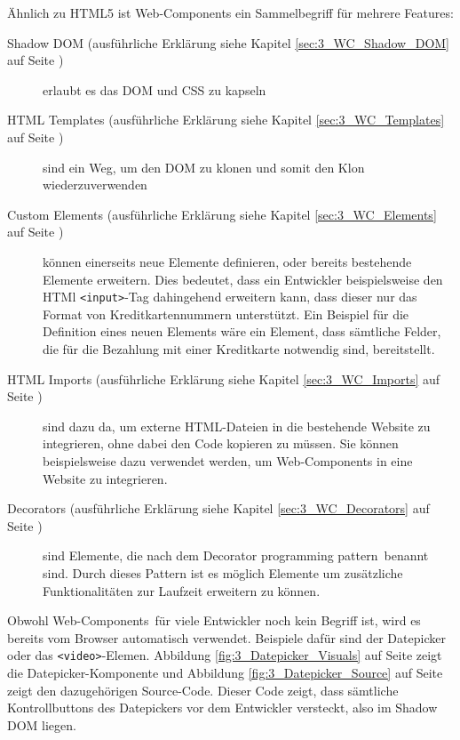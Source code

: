 Ähnlich zu HTML5 ist Web-Components ein Sammelbegriff für mehrere Features:
\begin{description}
\item[Shadow DOM (ausführliche Erklärung siehe Kapitel \ref{sec:3_WC_Shadow_DOM} auf Seite \pageref{sec:3_WC_Shadow_DOM})] erlaubt es das DOM und CSS zu kapseln
\item[HTML Templates (ausführliche Erklärung siehe Kapitel \ref{sec:3_WC_Templates} auf Seite \pageref{sec:3_WC_Templates})] sind ein Weg, um den DOM zu klonen und somit den Klon wiederzuverwenden
\item[Custom Elements (ausführliche Erklärung siehe Kapitel \ref{sec:3_WC_Elements} auf Seite \pageref{sec:3_WC_Elements})] können einerseits neue Elemente definieren, oder bereits bestehende Elemente erweitern. Dies bedeutet, dass ein Entwickler beispielsweise den HTMl \lstinline|<input>|-Tag dahingehend erweitern kann, dass dieser nur das Format von Kreditkartennummern unterstützt. Ein Beispiel für die Definition eines neuen Elements wäre ein Element, dass sämtliche Felder, die für die Bezahlung mit einer Kreditkarte notwendig sind, bereitstellt.
\item[HTML Imports (ausführliche Erklärung siehe Kapitel \ref{sec:3_WC_Imports} auf Seite \pageref{sec:3_WC_Imports})] sind dazu da, um externe HTML-Dateien in die bestehende Website zu integrieren, ohne dabei den Code kopieren zu müssen. Sie können beispielsweise dazu verwendet werden, um Web-Components in eine Website zu integrieren.
\item[Decorators (ausführliche Erklärung siehe Kapitel \ref{sec:3_WC_Decorators} auf Seite \pageref{sec:3_WC_Decorators})] sind Elemente, die nach dem \glqq Decorator programming pattern\grqq\ benannt sind. Durch dieses Pattern ist es möglich Elemente um zusätzliche Funktionalitäten zur Laufzeit erweitern zu können.
\end{description}

Obwohl \glqq Web-Components\grqq\ für viele Entwickler noch kein Begriff ist, wird es bereits vom Browser automatisch verwendet. Beispiele dafür sind der Datepicker oder das \lstinline|<video>|-Elemen. Abbildung \ref{fig:3_Datepicker_Visuals} auf Seite \pageref{fig:3_Datepicker_Visuals} zeigt die Datepicker-Komponente und Abbildung \ref{fig:3_Datepicker_Source} auf Seite \pageref{fig:3_Datepicker_Source} zeigt den dazugehörigen Source-Code. Dieser Code zeigt, dass sämtliche Kontrollbuttons des Datepickers vor dem Entwickler \glqq versteckt\grqq , also im Shadow DOM liegen.


